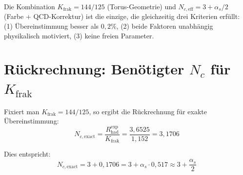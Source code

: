 	\begin{table}[h]
		\centering
		\caption{Ergebnis des systematischen Scans. Die Kombination $K_\text{frak} = 144/125$ mit $N_{c,\text{eff}} = 3 + \alpha_s/2$ liefert die beste Übereinstimmung.}
		\label{tab:scan}
	\end{table}
	
	\begin{keypoint}
		Die Kombination $K_\text{frak} = 144/125$ (Torus-Geometrie) und $N_{c,\text{eff}} = 3 + \alpha_s/2$ (Farbe + QCD-Korrektur) ist die einzige, die gleichzeitig drei Kriterien erfüllt: (1) Übereinstimmung besser als $0{,}2\%$, (2) beide Faktoren unabhängig physikalisch motiviert, (3) keine freien Parameter.
	\end{keypoint}
	
	
	\section{Rückrechnung: Benötigter $N_c$ für $K_\text{frak}$}
	
	Fixiert man $K_\text{frak} = 144/125$, so ergibt die Rückrechnung für exakte Übereinstimmung:
	\begin{equation}
		N_{c,\text{exact}} = \frac{R_\text{had}^\text{exp}}{K_\text{frak}} = \frac{3{,}6525}{1{,}152} = 3{,}1706
	\end{equation}
	
	Dies entspricht:
	\begin{equation}
		N_{c,\text{exact}} = 3 + 0{,}1706 = 3 + \alpha_s \cdot 0{,}517 \approx 3 + \frac{\alpha_s}{2}
	\end{equation}
	
